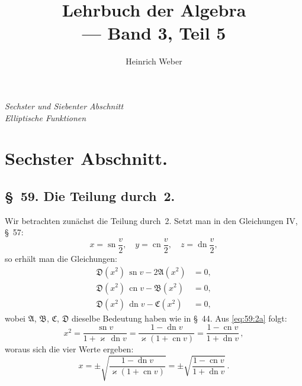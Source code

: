 \documentclass[11pt,a4paper]{article}
\title{\textbf{Lehrbuch der Algebra} \\ --- Band 3, Teil 5}
\author{Heinrich Weber}
\date{}
\theoremstyle{plain}
\theoremstyle{remark}
\newcommand{\A}{\mathfrak{A}}
\newcommand{\B}{\mathfrak{B}}
\newcommand{\CC}{\mathfrak{C}}
\newcommand{\D}{\mathfrak{D}}
\begin{document}
\maketitle
\thispagestyle{empty}
\vfill
\begin{center}
\textit{Sechster und Siebenter Abschnitt}\\[4pt]
\textit{Elliptische Funktionen}
\end{center}
\vfill
\newpage
\setcounter{page}{201}

\section*{Sechster Abschnitt.}

\subsection*{\S~59. Die Teilung durch~2.}

Wir betrachten zunächst die Teilung durch~2. Setzt man in den
Gleichungen IV, \S~57:
\begin{equation}\label{eq:59:1}
x = \operatorname{sn}\frac{v}{2},\quad
y = \operatorname{cn}\frac{v}{2},\quad
z = \operatorname{dn}\frac{v}{2},
\end{equation}
so erhält man die Gleichungen:
\begin{align}
\D(x^2)\,\operatorname{sn}v - 2\A(x^2) &= 0, \label{eq:59:2a}\\
\D(x^2)\,\operatorname{cn}v - \B(x^2) &= 0, \label{eq:59:2b}\\
\D(x^2)\,\operatorname{dn}v - \CC(x^2) &= 0, \label{eq:59:2c}
\end{align}
wobei $\A$, $\B$, $\CC$, $\D$ dieselbe Bedeutung haben wie in \S~44.
Aus \eqref{eq:59:2a} folgt:
\begin{equation}\label{eq:59:3}
x^2 = \frac{\operatorname{sn}v}{1+\varkappa\,\operatorname{dn}v}
       = \frac{1-\operatorname{dn}v}{\varkappa(1+\operatorname{cn}v)}
       = \frac{1-\operatorname{cn}v}{1+\operatorname{dn}v}\,,
\end{equation}
woraus sich die vier Werte ergeben:
\begin{equation}
x = \pm\sqrt{\frac{1-\operatorname{dn}v}{\varkappa(1+\operatorname{cn}v)}}
   = \pm\sqrt{\frac{1-\operatorname{cn}v}{1+\operatorname{dn}v}}\,.\tag{3$'$}
\end{equation}
\end{document}
